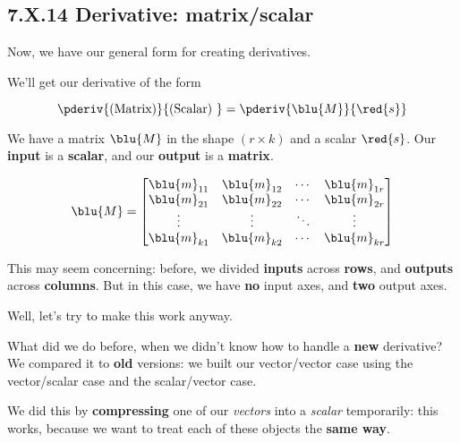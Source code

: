     \subsection*{7.X.14 \quad Derivative: matrix/scalar}
    
        Now, we have our general form for creating derivatives.
        
        We'll get our derivative of the form 
        
        \begin{equation}
            \pderiv{ \text{(Matrix)} } { \text{(Scalar) } }
            =
            \pderiv{ \blu{M} }{ \red{s} } 
        \end{equation}
        
        We have a matrix $\blu{M}$ in the shape $(r \times k)$ and a scalar $\red{s}$. Our \textbf{input} is a \textbf{scalar}, and our \textbf{output} is a \textbf{matrix}.
        
        \begin{equation}
            \blu{M}
            =
            \begin{bmatrix}
                \blu{m}_{11} & \blu{m}_{12} & \cdots & \blu{m}_{1r} \\ 
                \blu{m}_{21} & \blu{m}_{22} & \cdots & \blu{m}_{2r} \\ 
                \vdots       & \vdots       & \ddots & \vdots     \\
                \blu{m}_{k1} & \blu{m}_{k2} & \cdots & \blu{m}_{kr} \\ 
            \end{bmatrix}
        \end{equation}
        
        This may seem concerning: before, we divided \textbf{inputs} across \textbf{rows}, and \textbf{outputs} across \textbf{columns}. But in this case, we have \textbf{no} input axes, and \textbf{two} output axes. 
        
        Well, let's try to make this work anyway. 
        
        What did we do before, when we didn't know how to handle a \textbf{new} derivative? We compared it to \textbf{old} versions: we built our vector/vector case using the vector/scalar case and the scalar/vector case.
        
        We did this by \textbf{compressing} one of our \textit{vectors} into a \textit{scalar} temporarily: this works, because we want to treat each of these objects the \textbf{same way}.
        
